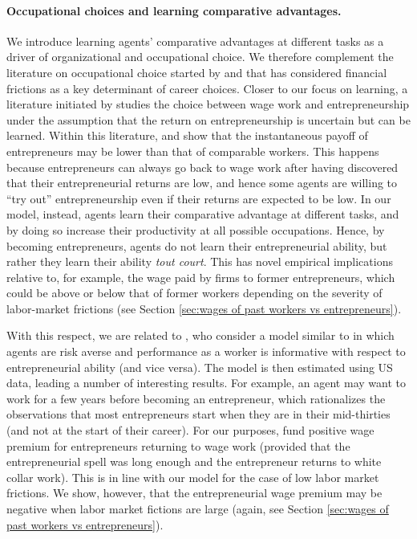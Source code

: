 \documentclass[12pt,american]{paper}
\theoremstyle{remark}
\begin{document}
\paragraph{Occupational choices and learning comparative advantages.} 
We introduce learning agents' comparative advantages at different tasks as a driver of organizational and occupational choice. We therefore complement the literature on occupational choice started by \cite{Banerjee1993} and \cite{Galor1993} that has considered financial frictions as a key determinant of career choices. Closer to our focus on learning, a literature initiated by \cite{vereshchagina2009risk}  studies the choice between wage work and entrepreneurship under the assumption that the return on entrepreneurship is uncertain but can be learned.  Within this literature, \cite{manso2016experimentation} and \cite{NBERw23168} show that the instantaneous payoff of entrepreneurs may be lower than that of comparable workers. This happens because entrepreneurs can always go back to wage work after having discovered that their entrepreneurial returns are low, and hence some agents are willing to ``try out'' entrepreneurship even if their returns are expected to be low. In our model, instead, agents learn their comparative advantage at different tasks, and by doing so increase their productivity at all possible occupations. Hence, by becoming entrepreneurs, agents do not learn their entrepreneurial ability, but rather they learn their ability \emph{tout court}. This has novel empirical implications relative to, for example,  the wage paid by firms to former entrepreneurs, which could be above or below that of  former workers depending on the severity of labor-market frictions (see Section \ref{sec:wages of past workers vs entrepreneurs}).

With this respect, we are related to  \cite{Hincapie2020}, who consider a model similar to \cite{NBERw23168} in which agents are risk averse and performance as a worker is informative with respect to entrepreneurial ability (and vice versa). The model is then estimated using US data, leading a number of interesting results. For example, an agent may want to work for a few years before becoming an entrepreneur, which rationalizes the observations that most entrepreneurs start when they are in their mid-thirties (and not at the start of their career). For our purposes, \cite{Hincapie2020} fund positive wage premium for entrepreneurs returning to wage work (provided that the entrepreneurial spell was long enough and the entrepreneur returns to white collar work). This is in line with our model for the case of low labor market frictions. We show, however, that the entrepreneurial wage premium may be negative when labor market fictions are large (again, see Section \ref{sec:wages of past workers vs entrepreneurs}).%
\end{document}
